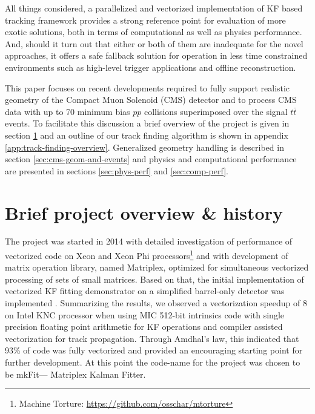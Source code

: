 \documentclass{webofc}
\def\mkfit{mkFit\xspace}
\begin{document}
All things considered, a parallelized and vectorized implementation of KF
based tracking framework provides a strong reference point for evaluation of
more exotic solutions, both in terms of computational as well as physics
performance. And, should it turn out that either or both of them are
inadequate for the novel approaches, it offers a safe fallback solution for
operation in less time constrained environments such as high-level trigger
applications and offline reconstruction.

This paper focuses on recent developments required to fully support realistic
geometry of the Compact Muon Solenoid (CMS) detector and to process CMS data
with up to 70 minimum bias $pp$ collisions superimposed over the signal $t\bar{t}$
events. To facilitate this discussion a brief overview of the project is given
in section \ref{sec:project-overview} and an outline of our track finding
algorithm is shown in appendix \ref{app:track-finding-overview}. Generalized
geometry handling is described in section \ref{sec:cms-geom-and-events} and
physics and computational performance are presented in sections
\ref{sec:phys-perf} and \ref{sec:comp-perf}.


\section{Brief project overview \& history}
\label{sec:project-overview}

The project was started in 2014 with detailed investigation of performance of
vectorized code on Xeon and Xeon Phi processors\footnote{Machine Torture:
  \url{https://github.com/osschar/mtorture}} and with development of matrix
operation library, named Matriplex, optimized for simultaneous vectorized
processing of sets of small matrices. Based on that, the initial
implementation of vectorized KF fitting demonstrator on a simplified
barrel-only detector was implemented \cite{pkf-fit}. Summarizing the results,
we observed a vectorization speedup of 8 on Intel KNC processor when using MIC
512-bit intrinsics code with single precision floating point arithmetic for KF
operations and compiler assisted vectorization for track propagation. Through
Amdhal's law, this indicated that 93\% of code was fully vectorized and
provided an encouraging starting point for further development. At this point
the code-name for the project was chosen to be \mkfit --- Matriplex Kalman
Fitter.
\end{document}
